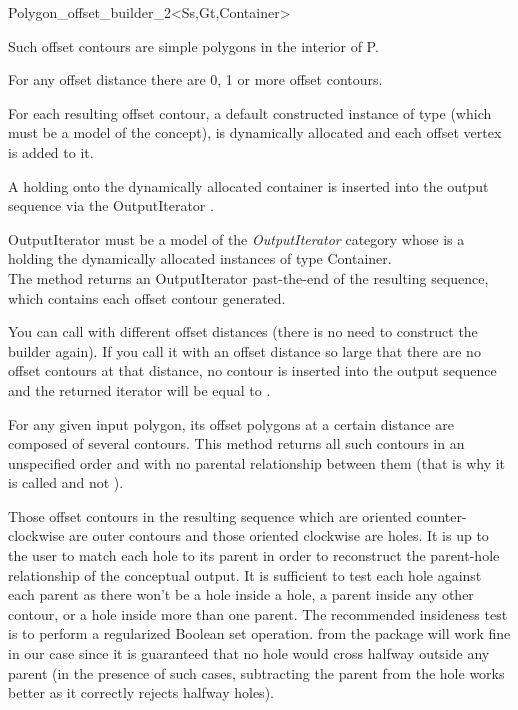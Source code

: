 \begin{ccRefClass}{Polygon_offset_builder_2<Ss,Gt,Container>}
{Such offset contours are simple polygons in the interior of P.

For any offset distance  there are 0, 1 or more offset contours.

For each resulting offset contour, a default constructed instance of  type (which must be a model of the  concept), is dynamically allocated and each offset vertex is added to it.

A  holding onto the dynamically allocated container is inserted into the output sequence via the OutputIterator .

OutputIterator must be a model of the \textit{OutputIterator} category whose  is a  holding the dynamically allocated instances of type Container.\\
The method returns an OutputIterator past-the-end of the resulting sequence, which contains each offset contour generated.

You can call  with different offset distances (there is no need to construct the builder  again). If you call it with an offset distance so large that there are no offset contours at that distance, no contour is inserted into the output sequence and the returned iterator will be equal to .

For any given input polygon, its offset polygons at a certain distance are composed of several contours. This method returns all such contours in an unspecified order and with no parental relationship between them (that is why it is called  and not ).

Those offset contours in the resulting sequence which are oriented counter-clockwise are outer contours and those oriented clockwise are holes. It is up to the user to match each hole to its parent in order to reconstruct the parent-hole relationship of the conceptual output. It is sufficient to test each hole against each parent as there won't be a hole inside a hole, a parent inside any other contour, or a hole inside more than one parent. The recommended insideness test is to perform a regularized Boolean set operation.  from the  package will work fine in our case since it is guaranteed that no hole would cross halfway outside any parent (in the presence of such cases, subtracting the parent from the hole works better as it correctly rejects halfway holes).}
  

\ccSeeAlso
{}\\
\\
\\
\end{ccRefClass}

